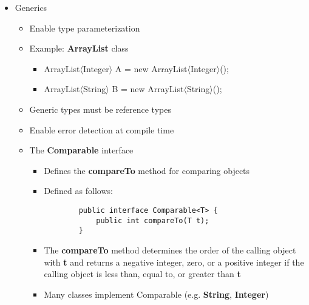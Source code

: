 \begin{itemize}
	\item Generics
	\begin{itemize}
		\item Enable type parameterization
		\item Example: \textbf{ArrayList} class
		\begin{itemize}
			\item ArrayList$\langle$Integer$\rangle$ A = new ArrayList$\langle$Integer$\rangle$();
			\item ArrayList$\langle$String$\rangle$ B = new ArrayList$\langle$String$\rangle$();
		\end{itemize}
		\item Generic types must be reference types
		\item Enable error detection at compile time
		\item The \textbf{Comparable} interface
		\begin{itemize}
			\item Defines the \textbf{compareTo} method for comparing objects
			\item Defined as follows:\\[5pt]
			\begin{minipage}{0.5\textwidth}
				\begin{Verbatim}
		public interface Comparable<T> {
			public int compareTo(T t);
		}
				\end{Verbatim}
			\end{minipage}
			\item The \textbf{compareTo} method determines the order of the calling object with \textbf{t} and returns a negative integer, zero, or a positive integer if the calling object is less than, equal to, or greater than \textbf{t}
			\item Many classes implement Comparable (e.g. \textbf{String}, \textbf{Integer})

\end{itemize}
\end{itemize}
\end{itemize}
